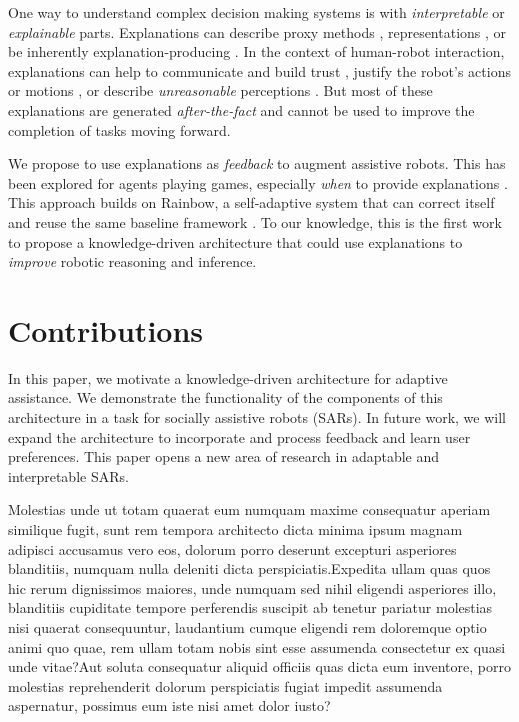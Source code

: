 \documentclass[letterpaper]{article} %
\begin{document}
One way to understand complex decision making systems is with
\emph{interpretable} or \emph{explainable} parts.  Explanations can describe
proxy methods \cite{why-trust,grad-cam,visualizing}, representations
\cite{netdissect2017,cavs}, or be inherently explanation-producing
\cite{multimodal}.
In the context
of human-robot interaction, explanations can help to communicate and
build trust \cite{wang2016trust}, justify the robot's actions
\cite{stange2020effects} or motions \cite{dragan2013legibility}, or
describe \emph{unreasonable} perceptions \cite{gilpin-hri}.  But most of
these explanations are generated \emph{after-the-fact} and cannot be used
to improve the completion of tasks moving forward.

We propose to use explanations as \emph{feedback} to augment assistive
robots.  This has been explored for agents playing games, especially
\emph{when} to provide explanations \cite{li2020reasoning}.  This approach
builds on Rainbow, a self-adaptive system that can correct itself and
reuse the same baseline framework \cite{rainbow}.  To our knowledge,
this is the first work to propose a knowledge-driven architecture that could use explanations to \emph{improve} robotic reasoning and inference.
\section{Contributions}

In this paper, we motivate a knowledge-driven architecture for adaptive assistance. We demonstrate the functionality of the components of this architecture in a task for socially assistive robots (SARs). In future work, we will expand the architecture to incorporate and process feedback and learn user preferences. This paper opens a new area of research in adaptable and interpretable SARs.


Molestias unde ut totam quaerat eum numquam maxime consequatur aperiam similique fugit, sunt rem tempora architecto dicta minima ipsum magnam adipisci accusamus vero eos, dolorum porro deserunt excepturi asperiores blanditiis, numquam nulla deleniti dicta perspiciatis.Expedita ullam quas quos hic rerum dignissimos maiores, unde numquam sed nihil eligendi asperiores illo, blanditiis cupiditate tempore perferendis suscipit ab tenetur pariatur molestias nisi quaerat consequuntur, laudantium cumque eligendi rem doloremque optio animi quo quae, rem ullam totam nobis sint esse assumenda consectetur ex quasi unde vitae?Aut soluta consequatur aliquid officiis quas dicta eum inventore, porro molestias reprehenderit dolorum perspiciatis fugiat impedit assumenda aspernatur, possimus eum iste nisi amet dolor iusto?\clearpage

\end{document}
